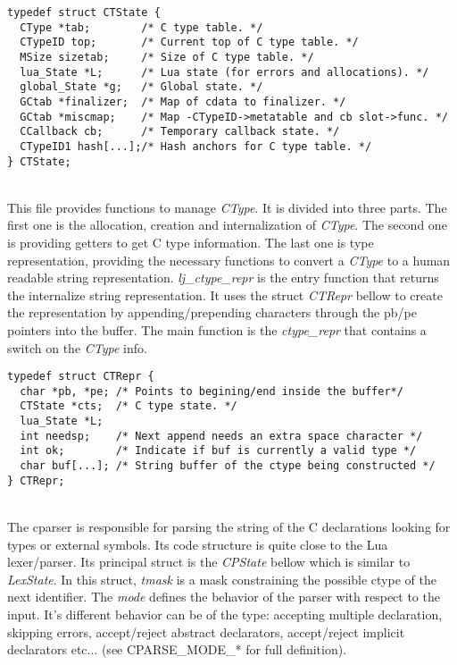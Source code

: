 \begin{adjustbox}{max width=\textwidth}
\begin{minipage}{\linewidth}
\begin{lstlisting}[style=CStyle]
typedef struct CTState {
  CType *tab;        /* C type table. */
  CTypeID top;       /* Current top of C type table. */
  MSize sizetab;     /* Size of C type table. */
  lua_State *L;      /* Lua state (for errors and allocations). */
  global_State *g;   /* Global state. */
  GCtab *finalizer;  /* Map of cdata to finalizer. */
  GCtab *miscmap;    /* Map -CTypeID->metatable and cb slot->func. */
  CCallback cb;      /* Temporary callback state. */
  CTypeID1 hash[...];/* Hash anchors for C type table. */
} CTState;
\end{lstlisting}
\end{minipage}
\end{adjustbox}

\\
This file provides functions to manage \emph{CType}. It is divided into three
parts. The first one is the allocation, creation and internalization of
\emph{CType}. The second one is providing getters to get C type information.
The last one is  type representation, providing the necessary functions to
convert a \emph{CType} to a human readable string representation.
\emph{lj\_ctype\_repr} is the entry function that returns the internalize string
representation. It uses the struct \emph{CTRepr} bellow to create the
representation by appending/prepending characters through the pb/pe pointers
into the buffer. The main function is the \emph{ctype\_repr} that contains a
switch on the \emph{CType} info.

\begin{lstlisting}[style=CStyle]
typedef struct CTRepr {
  char *pb, *pe; /* Points to begining/end inside the buffer*/
  CTState *cts;  /* C type state. */
  lua_State *L;
  int needsp;    /* Next append needs an extra space character */
  int ok;        /* Indicate if buf is currently a valid type */
  char buf[...]; /* String buffer of the ctype being constructed */
} CTRepr;
\end{lstlisting}

\\
The cparser is responsible for parsing the string of the C declarations looking
for types or external symbols. Its code structure is quite close to the
Lua lexer/parser. Its principal struct is the \emph{CPState} bellow which is
similar to \emph{LexState}. In this struct, \emph{tmask} is a mask constraining
the possible ctype of the next identifier. The \emph{mode} defines the behavior
of the parser with respect to the input. It's different behavior can be of the
type: accepting multiple declaration, skipping errors, accept/reject abstract
declarators, accept/reject implicit declarators etc... (see CPARSE\_MODE\_* for
full definition).

